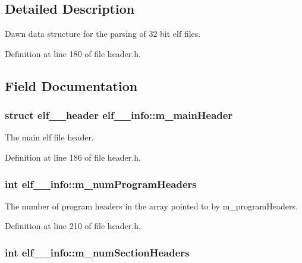 \subsection{Detailed Description}
Dawn data structure for the parsing of 32 bit elf files. 

Definition at line 180 of file header.h.



\subsection{Field Documentation}
\hypertarget{structelf__32__info_afad69f71c04aeaa868d04063781741ea}{
\subsubsection[{m\_\-mainHeader}]{\setlength{\rightskip}{0pt plus 5cm}struct {\bf elf\_\_\-header} {\bf elf\_\_\-info::m\_\-mainHeader}}}
\label{structelf__32__info_afad69f71c04aeaa868d04063781741ea}


The main elf file header. 



Definition at line 186 of file header.h.

\hypertarget{structelf__32__info_a3d0840d804c71febb4e372812f9f5b3e}{
\subsubsection[{m\_\-numProgramHeaders}]{\setlength{\rightskip}{0pt plus 5cm}int {\bf elf\_\_\-info::m\_\-numProgramHeaders}}}
\label{structelf__32__info_a3d0840d804c71febb4e372812f9f5b3e}


The number of program headers in the array pointed to by m\_\-programHeaders. 



Definition at line 210 of file header.h.

\hypertarget{structelf__32__info_a701e263cc9e77c5e031b01faef03ed79}{
\subsubsection[{m\_\-numSectionHeaders}]{\setlength{\rightskip}{0pt plus 5cm}int {\bf elf\_\_\-info::m\_\-numSectionHeaders}}}
\label{structelf__32__info_a701e263cc9e77c5e031b01faef03ed79}


